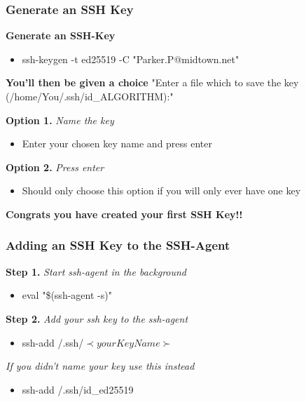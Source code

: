 \documentclass{beamer}
\begin{document}
\begin{frame}
	\frametitle{\textbf{Generate an SSH Key}}
	
	\textbf{Generate an SSH-Key}
	\begin{itemize}
		\item ssh-keygen -t ed25519 -C "Parker.P@midtown.net" 
	\end{itemize}
	\vspace{0.5cm}

	\textbf{You'll then be given a choice}
	"Enter a file which to save the key (/home/You/.ssh/id\_ALGORITHM):"	
	
	\vspace{0.5cm}
	\textbf{Option 1.} \textit{Name the key}
	\begin{itemize}
		\item Enter your chosen key name and press enter
	\end{itemize}

	\textbf{Option 2.} \textit{Press enter}
	\begin{itemize}
		\item Should only choose this option if you will only ever have one key
	\end{itemize}

	\begin{block}{}
		\textbf{Congrats you have created your first SSH Key!!}
	\end{block}

\end{frame}


\begin{frame}
	\frametitle{\textbf{Adding an SSH Key to the SSH-Agent}}

	\textbf{Step 1.} \textit{Start ssh-agent in the background}
	\begin{itemize}
		\item eval "\$(ssh-agent -s)"
	\end{itemize}

	\vspace{0.5cm}
	\textbf{Step 2.} \textit{Add your ssh key to the ssh-agent}
	\begin{itemize}
		\item ssh-add /.ssh/\(\prec yourKeyName \succ\)
	\end{itemize}

	\vspace{0.5cm}
	\textit{If you didn't name your key use this instead}
	\begin{itemize}
		\item ssh-add /.ssh/id\_ed25519 
	\end{itemize}
\end{frame}
\end{document}
